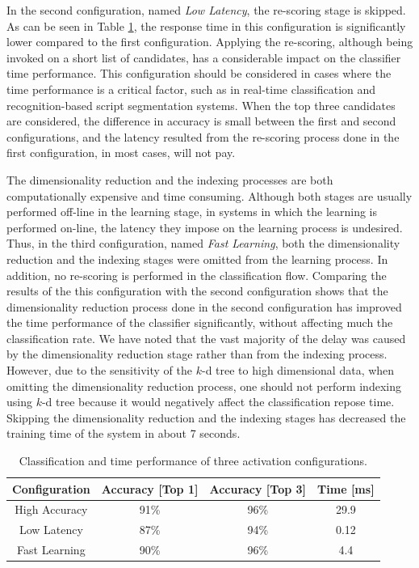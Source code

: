 In the second configuration, named \emph{Low Latency}, the re-scoring stage is skipped.
As can be seen in Table \ref{table:configurations}, the response time in this configuration is significantly lower compared to the first configuration.
Applying the re-scoring, although being invoked on a short list of candidates, has a considerable impact on the classifier time performance. 
This configuration should be considered in cases where the time performance is a critical factor, such as in real-time classification and recognition-based script segmentation systems.
When the top three candidates are considered, the difference in accuracy is small between the first and second configurations, and the latency resulted from the re-scoring process done in the first configuration, in most cases, will not pay. 

The dimensionality reduction and the indexing processes are both computationally expensive and time consuming. 
Although both stages are usually performed off-line in the learning stage, in systems in which the learning is performed on-line, the latency they impose on the learning process is undesired.
Thus, in the third configuration, named \emph{Fast Learning}, both the dimensionality reduction and the indexing stages were omitted from the learning process.
In addition, no re-scoring is performed in the classification flow.
Comparing the results of the this configuration with the second configuration shows that the dimensionality reduction process done in the second configuration has improved the time performance of the classifier significantly, without affecting much the classification rate.
We have noted that the vast majority of the delay was caused by the dimensionality reduction stage rather than from the indexing process.
However, due to the sensitivity of the $k$-d tree to high dimensional data, when omitting the dimensionality reduction process, one should not perform indexing using $k$-d tree because it would negatively affect the classification repose time.
Skipping the dimensionality reduction and the indexing stages has decreased the training time of the system in about 7 seconds.

\begin{table}
\centering
\caption{Classification and time performance of three activation configurations.}
\renewcommand{\arraystretch}{1.2}
\begin{tabular}{ | c | c | c | c |}
  \hline
  \textbf{Configuration}  & \textbf{Accuracy [Top 1]}  & \textbf{Accuracy [Top 3]} & \textbf{Time [ms]}\\
  \hline
  High Accuracy & 91\% & 96\% & 29.9 \\ 
  \hline
  Low Latency   & 87\% & 94\% & 0.12 \\
  \hline
  Fast Learning & 90\% & 96\% & 4.4 \\ 
  \hline
\end{tabular}
\label{table:configurations} 
\end{table}

